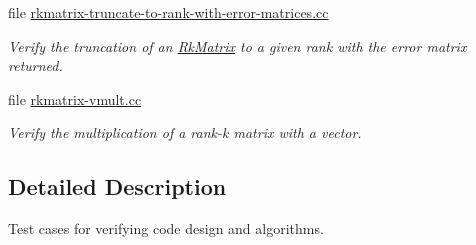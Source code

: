 \begin{DoxyCompactItemize}
file \hyperlink{rkmatrix-truncate-to-rank-with-error-matrices_8cc}{rkmatrix-\/truncate-\/to-\/rank-\/with-\/error-\/matrices.\+cc}
\begin{DoxyCompactList}\small\item\em Verify the truncation of an \hyperlink{classRkMatrix}{Rk\+Matrix} to a given rank with the error matrix returned. \end{DoxyCompactList}\item 
file \hyperlink{rkmatrix-vmult_8cc}{rkmatrix-\/vmult.\+cc}
\begin{DoxyCompactList}\small\item\em Verify the multiplication of a rank-\/k matrix with a vector. \end{DoxyCompactList}\end{DoxyCompactItemize}


\subsection{Detailed Description}
Test cases for verifying code design and algorithms. 

